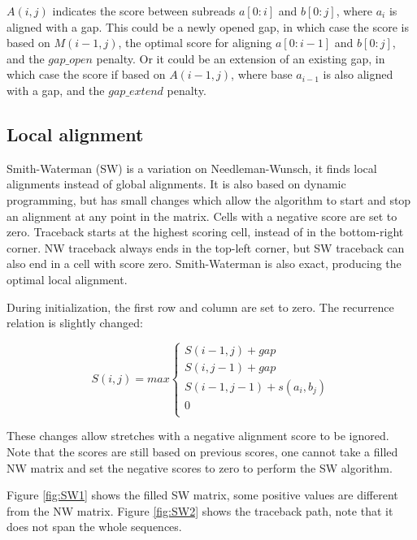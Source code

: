 \documentclass[../main/thesis.tex]{subfiles}
\begin{document}
$A(i,j)$ indicates the score between subreads $a[0:i]$ and $b[0:j]$, where $a_i$ is aligned with a gap.
This could be a newly opened gap, in which case the score is based on $M(i-1,j)$, the optimal score for aligning $a[0:i-1]$ and $b[0:j]$, and the $gap\_open$ penalty.
Or it could be an extension of an existing gap, in which case the score if based on $A(i-1,j)$, where base $a_{i-1}$ is also aligned with a gap, and the $gap\_extend$ penalty.


\subsection{Local alignment}
Smith-Waterman (SW) \cite{SW} is a variation on Needleman-Wunsch, it finds local alignments instead of global alignments.
It is also based on dynamic programming, but has small changes which allow the algorithm to start and stop an alignment at any point in the matrix.
Cells with a negative score are set to zero.
Traceback starts at the highest scoring cell, instead of in the bottom-right corner.
NW traceback always ends in the top-left corner, but SW traceback can also end in a cell with score zero.
Smith-Waterman is also exact, producing the optimal local alignment.

During initialization, the first row and column are set to zero.
The recurrence relation is slightly changed:

\begin{equation}
S(i,j) = max
\begin{cases}
S(i-1,j) + gap \\
S(i,j-1) + gap \\
S(i-1,j-1) + s(a_i,b_j) \\
0 \\
\end{cases}
\label{eq:SW_recursion}
\end{equation}

These changes allow stretches with a negative alignment score to be ignored.
Note that the scores are still based on previous scores, one cannot take a filled NW matrix and set the negative scores to zero to perform the SW algorithm.

Figure \ref{fig:SW1} shows the filled SW matrix, some positive values are different from the NW matrix.
Figure \ref{fig:SW2} shows the traceback path, note that it does not span the whole sequences.

\end{document}
